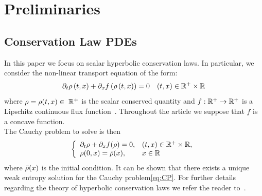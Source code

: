 \section{Preliminaries\label{sec:Preliminaries}}


\subsection{Conservation Law PDEs\label{sub:Hyperbolic-PDE's}}

In this paper we focus on scalar hyperbolic conservation laws. In particular, we consider the non-linear transport equation of the form:
\begin{equation}
\partial_t\rho\left(t,x\right)+\partial_x f\left(\rho\left(t,x\right)\right)=0 \quad (t,x) \in \mathbb{R}^+ \times \mathbb{R}\label{eq:cons}
\end{equation}
where $\rho=\rho(t,x) \in \; \mathbb{R}^+$ is the scalar conserved quantity and $f:\mathbb{R}^+\rightarrow \mathbb{R}^+$ is a Lipschitz continuous flux function~\cite{Bressan2006Hyperbolic}. Throughout the article we suppose that $f$ is a concave function. \\
The Cauchy problem to solve is then 
\begin{equation}
	\label{eq:CP}
		\left\{
		\begin{array}{ll}
		\partial_t \rho+ \partial_x f(\rho) =0, & (t,x)\in\mathbb{R}^+\times \mathbb{R},\\
		\rho(0,x)=\bar{\rho}(x), & x \in \mathbb{R}\\
		\end{array}
		\right.
\end{equation}
where $\bar{\rho}(x)$ is the initial condition.
It can be shown that there exists a unique weak entropy solution for the Cauchy problem\eqref{eq:CP}. For further details regarding the theory of hyperbolic conservation laws we refer the reader to~\cite{garavello2006traffic,Evans1998}.


